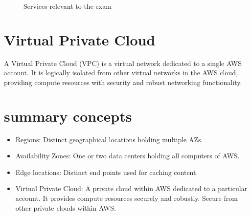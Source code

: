 \begin{figure}[htbp]
	\centering
	\caption{Services relevant to the exam}
\end{figure}

\section{Virtual Private Cloud}
A Virtual Private Cloud (VPC) is a virtual network dedicated to a single AWS account. It is logically isolated from other virtual networks in the AWS cloud, providing compute resources with security and robust networking functionality.

\section{summary concepts}
\begin{itemize}
	\item Regions: Distinct geographical locations holding multiple AZs.
	\item Availability Zones: One or two data centers holding all computers of AWS.
	\item Edge locations: Distinct end points used for caching content.
	\item Virtual Private Cloud: A private cloud within AWS dedicated to a particular account. It provides compute resources securely and robustly. Secure from other private clouds within AWS. 
\end{itemize}
